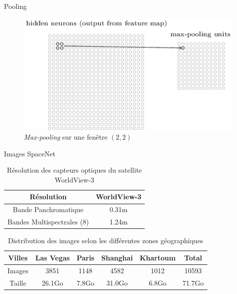\documentclass[11pt]{beamer}
\begin{document}
\begin{frame}{Pooling}
	\begin{figure}[H]
		\centering
		\includegraphics[scale=0.65]{Images/Pooling_Layer.png}
		\caption{\emph{Max-pooling} sur une fenêtre $(2,2)$}
	\end{figure}
\end{frame}

\begin{frame}{Images SpaceNet}
	\begin{table}[H]
		\centering
		\begin{tabular}{|c|c|}
		\hline 
		Résolution & WorldView-3 \\ 
		\hline 
		Bande Panchromatique & 0.31m \\ 
		\hline 
		Bandes Multispectrales (8) & 1.24m \\ 
		\hline
		\end{tabular}
		\caption{Résolution des capteurs optiques du satellite WorldView-3}	
	\end{table}
	\begin{table}[H]
		\centering
		 \begin{tabular}{|c|c|c|c|c|c|}
		\hline 
		Villes & Las Vegas & Paris & Shanghai & Khartoum & Total \\ 
		\hline 
		Images & 3851 & 1148 & 4582 & 1012 & 10593 \\ 
		\hline 
		Taille & 26.1Go & 7.8Go & 31.0Go & 6.8Go & 71.7Go \\ 
		\hline 
		\end{tabular}
		\caption{Distribution des images selon les différentes zones géographiques}
	\end{table} 
\end{frame}
\end{document}
